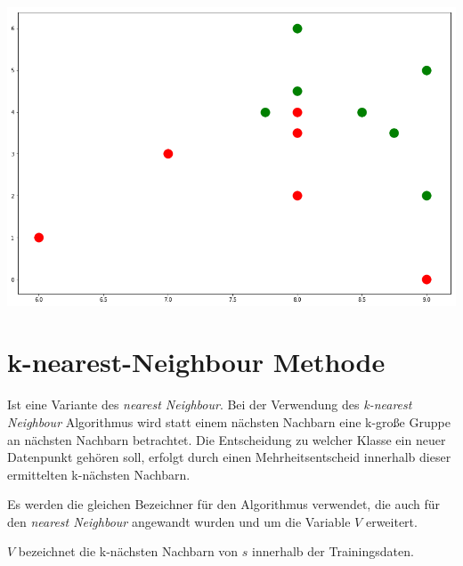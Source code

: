 \documentclass[fontsize=11pt]{scrartcl}
\newenvironment{Figure}
  {\par\medskip\noindent\minipage{\linewidth}}
  {\endminipage\par\medskip}
\begin{document}
\begin{Figure}
\begin{minipage}[b]{.4\linewidth}
                    \end{minipage}
                    \hspace{.1\linewidth}
                    \begin{minipage}[b]{.4\linewidth}
                        \includegraphics[scale=0.2]{errnn3.png}
                    \end{minipage}
                \end{Figure}           
                
                         
        \section{k-nearest-Neighbour Methode}
            Ist eine Variante des \emph{nearest Neighbour}. Bei der Verwendung des \emph{k-nearest Neighbour} Algorithmus wird statt einem nächsten Nachbarn eine k-große Gruppe an nächsten Nachbarn betrachtet. Die Entscheidung zu welcher Klasse ein neuer Datenpunkt gehören soll, erfolgt durch einen Mehrheitsentscheid innerhalb dieser ermittelten k-nächsten Nachbarn.\cite{ertel2016}\par
            Es werden die gleichen Bezeichner für den Algorithmus verwendet, die auch für den \emph{nearest Neighbour} angewandt wurden und um die Variable $V$ erweitert.\par $V$ bezeichnet die k-nächsten Nachbarn von $s$ innerhalb der Trainingsdaten.
        
                           
\end{document}

